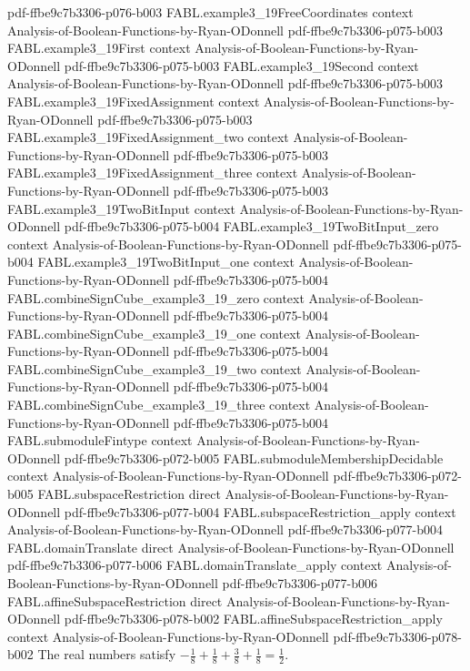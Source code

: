 \begin{theorem}
  {pdf-ffbe9c7b3306-p076-b003}
\proofstep
  {FABL.example3_19FreeCoordinates}
  {context}
  {Analysis-of-Boolean-Functions-by-Ryan-ODonnell}
  {pdf-ffbe9c7b3306-p075-b003}
\proofstep
  {FABL.example3_19First}
  {context}
  {Analysis-of-Boolean-Functions-by-Ryan-ODonnell}
  {pdf-ffbe9c7b3306-p075-b003}
\proofstep
  {FABL.example3_19Second}
  {context}
  {Analysis-of-Boolean-Functions-by-Ryan-ODonnell}
  {pdf-ffbe9c7b3306-p075-b003}
\proofstep
  {FABL.example3_19FixedAssignment}
  {context}
  {Analysis-of-Boolean-Functions-by-Ryan-ODonnell}
  {pdf-ffbe9c7b3306-p075-b003}
\proofstep
  {FABL.example3_19FixedAssignment_two}
  {context}
  {Analysis-of-Boolean-Functions-by-Ryan-ODonnell}
  {pdf-ffbe9c7b3306-p075-b003}
\proofstep
  {FABL.example3_19FixedAssignment_three}
  {context}
  {Analysis-of-Boolean-Functions-by-Ryan-ODonnell}
  {pdf-ffbe9c7b3306-p075-b003}
\proofstep
  {FABL.example3_19TwoBitInput}
  {context}
  {Analysis-of-Boolean-Functions-by-Ryan-ODonnell}
  {pdf-ffbe9c7b3306-p075-b004}
\proofstep
  {FABL.example3_19TwoBitInput_zero}
  {context}
  {Analysis-of-Boolean-Functions-by-Ryan-ODonnell}
  {pdf-ffbe9c7b3306-p075-b004}
\proofstep
  {FABL.example3_19TwoBitInput_one}
  {context}
  {Analysis-of-Boolean-Functions-by-Ryan-ODonnell}
  {pdf-ffbe9c7b3306-p075-b004}
\proofstep
  {FABL.combineSignCube_example3_19_zero}
  {context}
  {Analysis-of-Boolean-Functions-by-Ryan-ODonnell}
  {pdf-ffbe9c7b3306-p075-b004}
\proofstep
  {FABL.combineSignCube_example3_19_one}
  {context}
  {Analysis-of-Boolean-Functions-by-Ryan-ODonnell}
  {pdf-ffbe9c7b3306-p075-b004}
\proofstep
  {FABL.combineSignCube_example3_19_two}
  {context}
  {Analysis-of-Boolean-Functions-by-Ryan-ODonnell}
  {pdf-ffbe9c7b3306-p075-b004}
\proofstep
  {FABL.combineSignCube_example3_19_three}
  {context}
  {Analysis-of-Boolean-Functions-by-Ryan-ODonnell}
  {pdf-ffbe9c7b3306-p075-b004}
\proofstep
  {FABL.submoduleFintype}
  {context}
  {Analysis-of-Boolean-Functions-by-Ryan-ODonnell}
  {pdf-ffbe9c7b3306-p072-b005}
\proofstep
  {FABL.submoduleMembershipDecidable}
  {context}
  {Analysis-of-Boolean-Functions-by-Ryan-ODonnell}
  {pdf-ffbe9c7b3306-p072-b005}
\proofstep
  {FABL.subspaceRestriction}
  {direct}
  {Analysis-of-Boolean-Functions-by-Ryan-ODonnell}
  {pdf-ffbe9c7b3306-p077-b004}
\proofstep
  {FABL.subspaceRestriction_apply}
  {context}
  {Analysis-of-Boolean-Functions-by-Ryan-ODonnell}
  {pdf-ffbe9c7b3306-p077-b004}
\proofstep
  {FABL.domainTranslate}
  {direct}
  {Analysis-of-Boolean-Functions-by-Ryan-ODonnell}
  {pdf-ffbe9c7b3306-p077-b006}
\proofstep
  {FABL.domainTranslate_apply}
  {context}
  {Analysis-of-Boolean-Functions-by-Ryan-ODonnell}
  {pdf-ffbe9c7b3306-p077-b006}
\proofstep
  {FABL.affineSubspaceRestriction}
  {direct}
  {Analysis-of-Boolean-Functions-by-Ryan-ODonnell}
  {pdf-ffbe9c7b3306-p078-b002}
\proofstep
  {FABL.affineSubspaceRestriction_apply}
  {context}
  {Analysis-of-Boolean-Functions-by-Ryan-ODonnell}
  {pdf-ffbe9c7b3306-p078-b002}
\label{FABL.example3_19_first_coefficient_arithmetic}
\leanok
{}
The real numbers satisfy $-\frac18+\frac18+\frac38+\frac18=\frac12$.
\end{theorem}

